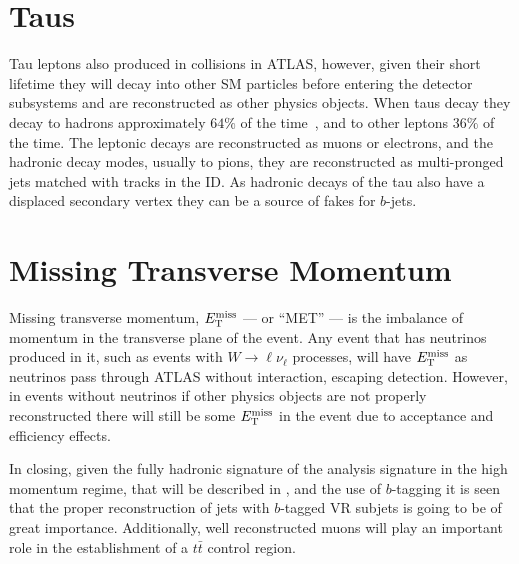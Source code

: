 \clearpage
\section{Taus}\label{section:taus}

Tau leptons also produced in collisions in ATLAS, however, given their short lifetime they will decay into other SM particles before entering the detector subsystems and are reconstructed as other physics objects.
When taus decay they decay to hadrons approximately $64\%$ of the time~\cite{Gallinaro:2014eha}, and to other leptons $36\%$ of the time.
The leptonic decays are reconstructed as muons or electrons, and the hadronic decay modes, usually to pions, they are reconstructed as multi-pronged jets matched with tracks in the ID.
As hadronic decays of the tau also have a displaced secondary vertex they can be a source of fakes for $b$-jets.

\section{Missing Transverse Momentum}\label{section:MET}

Missing transverse momentum, $E_{\mathrm{T}}^{\mathrm{miss}}$ --- or ``MET'' --- is the imbalance of momentum in the transverse plane of the event.
Any event that has neutrinos produced in it, such as events with $W \to \ell \nu_{\ell}$ processes, will have $E_{\mathrm{T}}^{\mathrm{miss}}$ as neutrinos pass through ATLAS without interaction, escaping detection.
However, in events without neutrinos if other physics objects are not properly reconstructed there will still be some $E_{\mathrm{T}}^{\mathrm{miss}}$ in the event due to acceptance and efficiency effects.

In closing, given the fully hadronic signature of the analysis signature in the high momentum regime, that will be described in , and the use of $b$-tagging it is seen that the proper reconstruction of \largeR{} jets with $b$-tagged VR subjets is going to be of great importance.
Additionally, well reconstructed muons will play an important role in the establishment of a $t\bar{t}$ control region.
